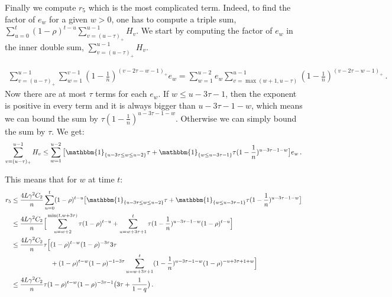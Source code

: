 \documentclass[twoside]{article}
\newcommand{\stepsize}{\gamma}
\newcommand{\overlap}{\tau}
\newcommand{\contraction}{\rho}
\newcommand{\lipschitz}{L}
\newcommand{\ind}{\mathbbm{1}}
\begin{document}
Finally we compute $r_5$ which is the most complicated term. 
Indeed, to find the factor of $e_w$ for a given $w > 0$, one has to compute a triple sum, $\sum_{u = 0}^t(1 - \contraction)^{t-u} \sum_{v=(u-\overlap)_+}^{u-1} H_v$.
We start by computing the factor of $e_w$ in the inner double sum, $\sum_{v=(u-\overlap)_+}^{u-1} H_v$.

\begin{align}
\sum_{v=(u-\overlap)_+}^{u-1} \sum_{w=1}^{v-1}(1-\frac{1}{n})^{(v -2\overlap -w -1)_+} e_w
= \sum_{w=1}^{u-2} e_w \sum_{v=\max(w+1, u-\overlap)}^{u-1} (1-\frac{1}{n})^{(v -2\overlap -w -1)_+}  \, .
\end{align}
Now there are at most $\overlap$ terms for each $e_w$. 
If $w \leq u - 3\overlap -1$, then the exponent is positive in every term and it is always bigger than $u -3\overlap -1 -w$, which means we can bound the sum by $\overlap (1-\frac{1}{n})^{u -3\overlap -1 -w}$. 
Otherwise we can simply bound the sum by $\overlap$. We get:
\begin{align}
\sum_{v=(u-\overlap)_+}^{u-1} H_v
\leq \sum_{w=1}^{u-2} 
	\big[
		\ind_{\{u -3\overlap \leq w \leq u -2\}}\overlap	
		+ \ind_{\{w \leq u -3\overlap -1\}}\overlap (1-\frac{1}{n})^{u -3\overlap -1 -w}
	\big] e_w  \, .
\end{align}

This means that for $w$ at time $t$:
\begin{align}\label{eq:r5}
r_5 
&\leq \frac{4\lipschitz\stepsize^2 C_2}{n} \sum_{u=0}^t (1 -\contraction)^{t-u}
	\big[
		\ind_{\{u -3\overlap \leq w \leq u -2\}}\overlap	
		+ \ind_{\{w \leq u -3\overlap -1\}}\overlap (1-\frac{1}{n})^{u -3\overlap -1 -w}
	\big]
\nonumber \\
&\leq \frac{4\lipschitz\stepsize^2 C_2}{n}
	\Big[
		\sum_{u=w+2}^{\min(t, w +3\overlap)} \overlap (1 -\contraction)^{t-u}
		+ \sum_{u=w +3\overlap +1}^t \overlap (1-\frac{1}{n})^{u -3\overlap -1 -w} (1 -\contraction)^{t-u}
	\Big]
\nonumber \\
&\leq \frac{4\lipschitz\stepsize^2 C_2}{n} \overlap
	\Big[
		(1 -\contraction)^{t-w}(1 -\contraction)^{-3\overlap} 3\overlap
\nonumber \\ &\qquad \qquad \qquad
		+ (1 -\contraction)^{t-w}(1 -\contraction)^{-1 -3\overlap}\sum_{u=w +3\overlap +1}^t (1-\frac{1}{n})^{u -3\overlap -1 -w} (1 -\contraction)^{-u +3\overlap +1 +w}
	\Big]
\nonumber \\
&\leq \frac{4\lipschitz\stepsize^2 C_2}{n} \overlap (1 -\contraction)^{t-w}(1 -\contraction)^{-3\overlap-1}
	\big(
		3\overlap
		+ \frac{1}{1-q}
	\big) \,  .
\end{align}
\end{document}
